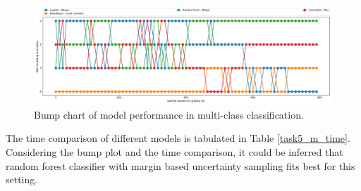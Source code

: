 \begin{figure}[t!]
	\centering
	\includegraphics[scale=0.3]{images/task5_rank}
	\caption{Bump chart of model performance in multi-class classification.}
	\label{t5_m_bump}
	\vspace*{4.5in}
\end{figure}



The time comparison of different models is tabulated in Table \ref{task5_m_time}. Considering the bump plot and the time comparison, it could be inferred that random forest classifier with margin based uncertainty sampling fits best for this setting.

